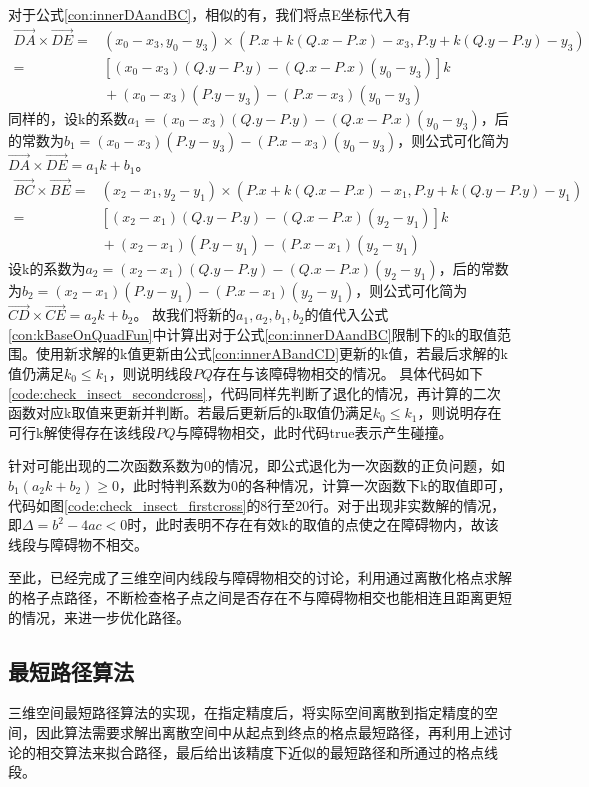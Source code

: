\par 对于公式\ref{con:innerDAandBC}，相似的有，我们将点E坐标代入有
\begin{align*} 
    \vec{DA}\times\vec{DE} = {}& (x_0-x_3,y_0-y_3)\times(P.x+k(Q.x-P.x)-x_3,P.y+k(Q.y-P.y)-y_3) \\ 
    = {}& [(x_0-x_3)(Q.y-P.y)-(Q.x-P.x)(y_0-y_3)]k  \\ 
    &{} +(x_0-x_3)(P.y-y_3)-(P.x-x_3)(y_0-y_3) 
\end{align*}
同样的，设k的系数$a_1=(x_0-x_3)(Q.y-P.y)-(Q.x-P.x)(y_0-y_3)$，后的常数为$b_1=(x_0-x_3)(P.y-y_3)-(P.x-x_3)(y_0-y_3)$，则公式可化简为$\vec{DA}\times\vec{DE} = a_1k+b_1$。
\begin{align*} 
    \vec{BC}\times\vec{BE} = {}& (x_2-x_1,y_2-y_1)\times(P.x+k(Q.x-P.x)-x_1,P.y+k(Q.y-P.y)-y_1) \\ 
    = {}& [(x_2-x_1)(Q.y-P.y)-(Q.x-P.x)(y_2-y_1)]k  \\ 
    &{} +(x_2-x_1)(P.y-y_1)-(P.x-x_1)(y_2-y_1) 
\end{align*}
设k的系数为$a_2=(x_2-x_1)(Q.y-P.y)-(Q.x-P.x)(y_2-y_1)$，后的常数为$b_2=(x_2-x_1)(P.y-y_1)-(P.x-x_1)(y_2-y_1)$，则公式可化简为$\vec{CD}\times\vec{CE} = a_2k+b_2$。
故我们将新的$a_1,a_2,b_1,b_2$的值代入公式\ref{con:kBaseOnQuadFun}中计算出对于公式\ref{con:innerDAandBC}限制下的k的取值范围。使用新求解的k值更新由公式\ref{con:innerABandCD}更新的k值，若最后求解的k值仍满足$k_0\leq k_1$，则说明线段$PQ$存在与该障碍物相交的情况。
具体代码如下\ref{code:check_insect_secondcross}，代码同样先判断了退化的情况，再计算的二次函数对应k取值来更新并判断。若最后更新后的k取值仍满足$k_0\leq k_1$，则说明存在可行k解使得存在该线段$PQ$与障碍物相交，此时代码true表示产生碰撞。

\par 针对可能出现的二次函数系数为0的情况，即公式退化为一次函数的正负问题，如$b_1(a_2k+b_2)\ge 0$，此时特判系数为0的各种情况，计算一次函数下k的取值即可，代码如图\ref{code:check_insect_firstcross}的8行至20行。对于出现非实数解的情况，即$\Delta=b^2-4ac<0$时，此时表明不存在有效k的取值的点使之在障碍物内，故该线段与障碍物不相交。
\par 至此，已经完成了三维空间内线段与障碍物相交的讨论，利用通过离散化格点求解的格子点路径，不断检查格子点之间是否存在不与障碍物相交也能相连且距离更短的情况，来进一步优化路径。

\subsection{最短路径算法}
\par 三维空间最短路径算法的实现，在指定精度后，将实际空间离散到指定精度的空间，因此算法需要求解出离散空间中从起点到终点的格点最短路径，再利用上述讨论的相交算法来拟合路径，最后给出该精度下近似的最短路径和所通过的格点线段。

